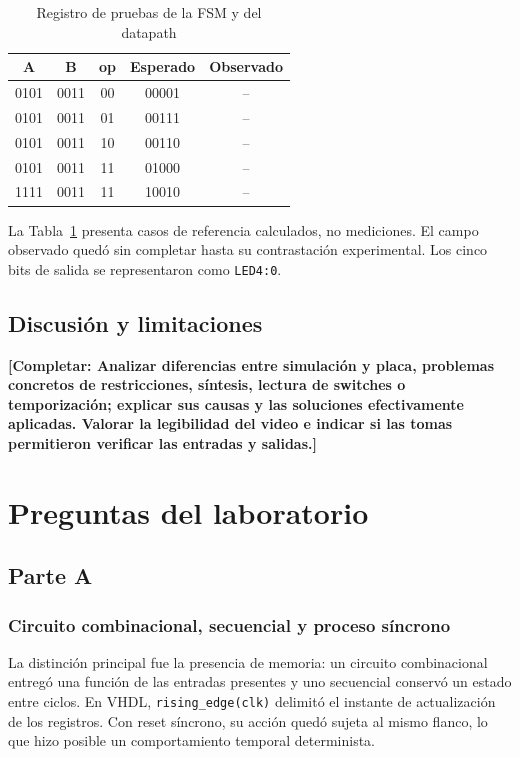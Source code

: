 \documentclass[conference]{IEEEtran}
\newcommand{\completar}[1]{\textcolor{pendiente}{\textbf{[Completar: #1]}}}
\begin{document}
\begin{table}[!t]
\centering\caption{Registro de pruebas de la FSM y del datapath}\label{tab:pruebas}
\begin{tabular}{@{}ccccc@{}}\toprule
\textbf{A} & \textbf{B} & \textbf{op} & \textbf{Esperado} & \textbf{Observado}\\\midrule
0101 & 0011 & 00 & 00001 & --\\
0101 & 0011 & 01 & 00111 & --\\
0101 & 0011 & 10 & 00110 & --\\
0101 & 0011 & 11 & 01000 & --\\
1111 & 0011 & 11 & 10010 & --\\\bottomrule
\end{tabular}
\end{table}
La Tabla~\ref{tab:pruebas} presenta casos de referencia calculados, no mediciones. El campo observado quedó sin completar hasta su contrastación experimental. Los cinco bits de salida se representaron como \texttt{LED4:0}.

\subsection{Discusión y limitaciones}
\completar{Analizar diferencias entre simulación y placa, problemas concretos de restricciones, síntesis, lectura de switches o temporización; explicar sus causas y las soluciones efectivamente aplicadas. Valorar la legibilidad del video e indicar si las tomas permitieron verificar las entradas y salidas.}

\section{Preguntas del laboratorio}
\subsection{Parte A}
\subsubsection{Circuito combinacional, secuencial y proceso síncrono}
La distinción principal fue la presencia de memoria: un circuito combinacional entregó una función de las entradas presentes y uno secuencial conservó un estado entre ciclos. En VHDL, \texttt{rising\_edge(clk)} delimitó el instante de actualización de los registros. Con reset síncrono, su acción quedó sujeta al mismo flanco, lo que hizo posible un comportamiento temporal determinista.
\end{document}

